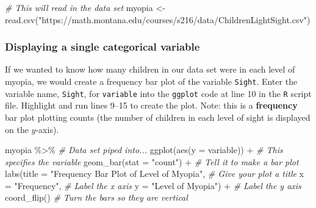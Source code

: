 \documentclass[
]{report}
\newenvironment{Shaded}{\begin{snugshade}}{\end{snugshade}}
\newcommand{\AttributeTok}[1]{\textcolor[rgb]{0.77,0.63,0.00}{#1}}
\newcommand{\CommentTok}[1]{\textcolor[rgb]{0.56,0.35,0.01}{\textit{#1}}}
\newcommand{\FunctionTok}[1]{\textcolor[rgb]{0.00,0.00,0.00}{#1}}
\newcommand{\NormalTok}[1]{#1}
\newcommand{\OtherTok}[1]{\textcolor[rgb]{0.56,0.35,0.01}{#1}}
\newcommand{\SpecialCharTok}[1]{\textcolor[rgb]{0.00,0.00,0.00}{#1}}
\newcommand{\StringTok}[1]{\textcolor[rgb]{0.31,0.60,0.02}{#1}}
\begin{document}
\begin{Shaded}
\begin{Highlighting}[]
\CommentTok{\# This will read in the data set}
\NormalTok{myopia }\OtherTok{\textless{}{-}} \FunctionTok{read.csv}\NormalTok{(}\StringTok{"https://math.montana.edu/courses/s216/data/ChildrenLightSight.csv"}\NormalTok{) }
\end{Highlighting}
\end{Shaded}

\hypertarget{displaying-a-single-categorical-variable}{%
\subsubsection*{Displaying a single categorical variable}\label{displaying-a-single-categorical-variable}}

If we wanted to know how many children in our data set were in each level of myopia, we would create a frequency bar plot of the variable \texttt{Sight}. Enter the variable name, \texttt{Sight}, for \texttt{variable} into the \texttt{ggplot} code at line 10 in the \texttt{R} script file. Highlight and run lines 9--15 to create the plot. Note: this is a \textbf{frequency} bar plot plotting counts (the number of children in each level of sight is displayed on the \(y\)-axis).

\begin{Shaded}
\begin{Highlighting}[]
\NormalTok{myopia }\SpecialCharTok{\%\textgreater{}\%} \CommentTok{\# Data set piped into...}
\FunctionTok{ggplot}\NormalTok{(}\FunctionTok{aes}\NormalTok{(}\AttributeTok{y =}\NormalTok{ variable)) }\SpecialCharTok{+}   \CommentTok{\# This specifies the variable}
  \FunctionTok{geom\_bar}\NormalTok{(}\AttributeTok{stat =} \StringTok{"count"}\NormalTok{) }\SpecialCharTok{+}  \CommentTok{\# Tell it to make a bar plot}
  \FunctionTok{labs}\NormalTok{(}\AttributeTok{title =} \StringTok{"Frequency Bar Plot of Level of Myopia"}\NormalTok{,  }\CommentTok{\# Give your plot a title}
       \AttributeTok{x =} \StringTok{"Frequency"}\NormalTok{,   }\CommentTok{\# Label the x axis}
       \AttributeTok{y =} \StringTok{"Level of Myopia"}\NormalTok{)  }\SpecialCharTok{+} \CommentTok{\# Label the y axis}
  \FunctionTok{coord\_flip}\NormalTok{()  }\CommentTok{\# Turn the bars so they are vertical}
\end{Highlighting}
\end{Shaded}
\end{document}
